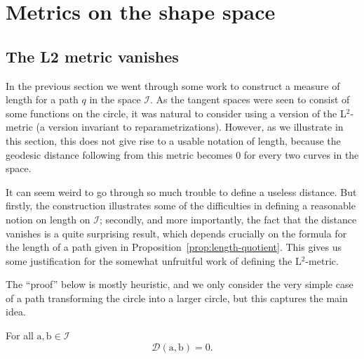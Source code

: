 
\section{Metrics on the shape space}
\label{sec:metrics-shape-space}


\subsection{The L2 metric vanishes}
\label{sec:l2-metric-vanishes}

In the previous section we went through some work to construct a measure of length for a path $q$ in the space $\mathcal{I}$. As the tangent spaces were seen to consist of some functions on the circle, it was natural to consider using a version of the L$^2$-metric (a version invariant to reparametrizations). However, as we illustrate in this section, this does not give rise to a usable notation of length, because the geodesic distance following from this metric becomes 0 for every two curves in the space.

It can seem weird to go through so much trouble to define a useless distance. But firstly, the construction illustrates some of the difficulties in defining a reasonable notion on length on $\mathcal{I}$; secondly, and more importantly, the fact that the distance vanishes is a quite surprising result, which depends crucially on the formula for the length of a path given in Proposition~\ref{prop:length-quotient}. This gives us some justification for the somewhat unfruitful work of defining the L$^2$-metric.

The ``proof'' below is mostly heuristic, and we only consider the very simple case of a path transforming the circle into a larger circle, but this captures the main idea.
\begin{theorem}
  \label{theorem:l2-metric-vanishes}
  For all $\mathrm{a},\mathrm{b} \in \mathcal{I}$
  \begin{equation*}
    \mathcal{D}(\mathrm{a},\mathrm{b}) = 0.
  \end{equation*}
\end{theorem}

